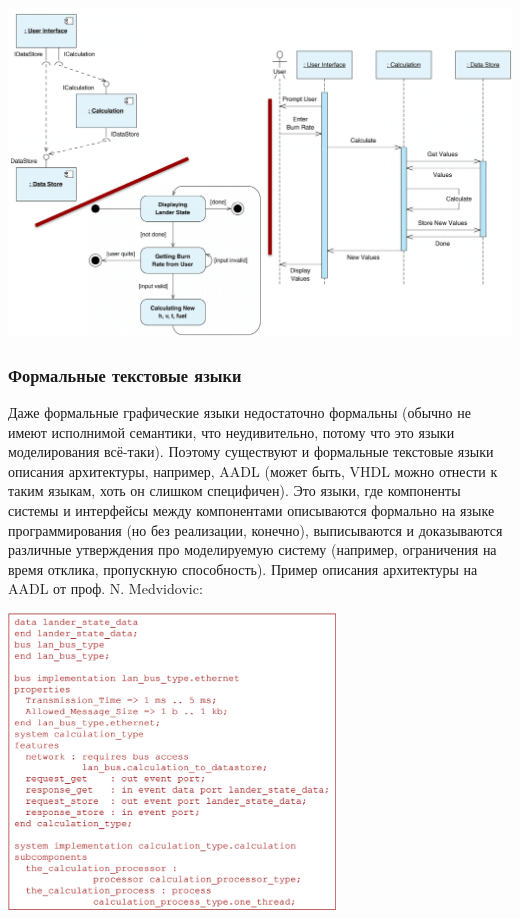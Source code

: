 \documentclass{../../text-style}
\begin{document}
\begin{center}
    \includegraphics[width=\textwidth]{uml.png}
\end{center}

\subsubsection{Формальные текстовые языки}

Даже формальные графические языки недостаточно формальны (обычно не имеют исполнимой семантики, что неудивительно, потому что это языки моделирования всё-таки). Поэтому существуют и формальные текстовые языки описания архитектуры, например, AADL (может быть, VHDL можно отнести к таким языкам, хоть он слишком специфичен). Это языки, где компоненты системы и интерфейсы между компонентами описываются формально на языке программирования (но без реализации, конечно), выписываются и доказываются различные утверждения про моделируемую систему (например, ограничения на время отклика, пропускную способность). Пример описания архитектуры на AADL от проф. N. Medvidovic:

\begin{center}
    \includegraphics[width=0.65\textwidth]{aadl.png}
\end{center}
\end{document}
